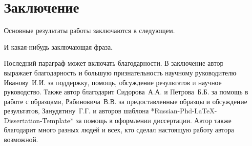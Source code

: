 \chapter*{Заключение}						%


Основные результаты работы заключаются в следующем.

И какая-нибудь заключающая фраза.

Последний параграф может включать благодарности.  В заключение автор
выражает благодарность и большую признательность научному руководителю
Иванову~И.И. за поддержку, помощь, обсуждение результатов и научное
руководство. Также автор благодарит Сидорова~А.А. и Петрова~Б.Б. за
помощь в работе с образцами, Рабиновича~В.В. за предоставленные
образцы и обсуждение результатов, Занудятину~Г.Г. и авторов шаблона
*Russian-Phd-LaTeX-Dissertation-Template* за помощь в оформлении
диссертации. Автор также благодарит много разных людей и
всех, кто сделал настоящую работу автора возможной.
